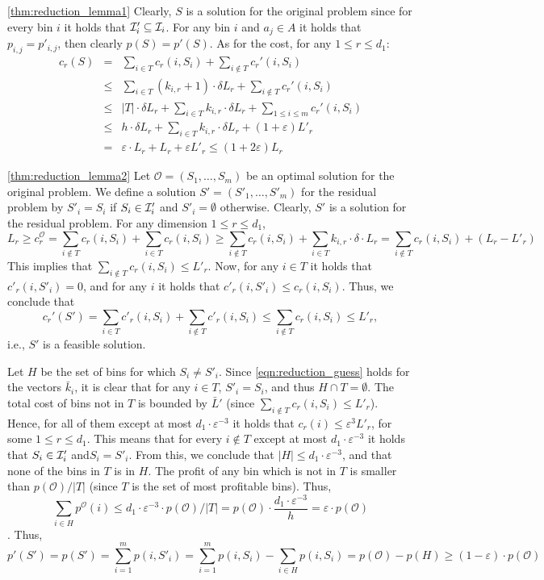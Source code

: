 \documentclass[11pt]{article}
\newcommand{\eps}{\varepsilon}
\newcommand{\bk}{\bar{k}}
\newcommand{\bS}{S}
\newcommand{\cI}{{\cal I}}
\newcommand{\bL}{\bar{L}}
\newcommand{\mO}{\mathcal{O}}
\newcommand{\abs}[1]{ \left| #1 \right |}
\newenvironment{dl_proof}[1]{\noindent{\bf Proof of Lemma #1:}}{
 \hspace*{\fill} $\Box$ \vskip \belowdisplayskip}
\begin{document}
{\begin{dl_proof}{\ref{thm:reduction_lemma1}}
Clearly, $\bS$ is a solution for the original problem since for every bin $i$ it holds that $\cI'_i \subseteq \cI_i$.
For any bin $i$ and $a_j\in A$ it holds that $p_{i,j}=p'_{i,j}$, then clearly $p(\bS)=p'(\bS)$.
As for the cost, for any $1\leq r \leq d_1$:
\begin{eqnarray*}
c_r(\bS) &=& \sum_{i\in T} c_r(i,S_i) + \sum_{i\notin T} c_r'(i,S_i) \\
&\leq& \sum_{i \in T} (k_{i,r}+1)\cdot \delta L_r +\sum_{i\notin T} c_r'(i,S_i) \\
&\leq& \abs{T} \cdot \delta  L_r + \sum_{i \in T} k_{i,r}\cdot \delta  L_r
               +\sum_{1\leq i\leq m} c_r'(i,S_i) \\
&\leq& h \cdot \delta   L_r + \sum_{i \in T} k_{i,r}\cdot \delta  L_r
               +(1+\eps) L'_r \\
&=& \eps \cdot L_r + L_r + \eps L'_r  \leq (1+2\eps) L_r
\end{eqnarray*}
\end{dl_proof}

\begin{dl_proof}{\ref{thm:reduction_lemma2}}
Let $\mO=(S_1,\ldots,S_m)$ be an optimal solution for the original problem. We define a
solution $\bS'=(S'_1,\ldots,S'_m)$ for the residual problem by $S'_i=S_i$ if  $S_i \in \cI'_i$ and
$S'_i=\emptyset$ otherwise. Clearly, $\bS'$ is a solution for the residual problem.
For any dimension $1\leq r \leq d_1$,
$$ L_r \geq c_r^{\mO} = \sum_{i \notin T} c_r(i,S_i)  + \sum_{i \in T} c_r(i,S_i) \geq
\sum_{i \notin T} c_r(i,S_i)  + \sum_{i \in T} k_{i,r} \cdot \delta \cdot L_r = \sum_{i \notin T} c_r(i,S_i) + (L_r-L'_r)$$
This implies that $\sum_{i \notin T} c_r(i,S_i) \leq L'_r$.  Now, for any $i\in T$ it holds that $c'_r(i,S'_i) = 0$, and
for any $i$ it holds that $c'_r(i,S'_i) \leq c_r(i,S_i)$. Thus, we conclude that
$$ c_r'(\bS') = \sum_{i\in T} c'_r(i,S_i) + \sum_{i \notin T} c'_r(i,S_i) \leq  \sum_{i \notin T} c_r(i,S_i) \leq L'_r,$$
i.e., $\bS'$ is a feasible solution.

Let $H$ be the set of bins for which $S_i \neq S'_i$.
Since  \eqref{eqn:reduction_guess} holds for the vectors $\bk_i$,
it is clear that for any $i\in T$, $S'_i = S_i$, and thus $H \cap T =\emptyset$.
The total cost of bins not in $T$ is bounded by $\bL'$ (since $\sum_{i \notin T} c_r(i,S_i) \leq L'_r$).
Hence, for all of them except at most $d_1 \cdot \eps^{-3} $ it holds that $c_r(i) \leq \eps^3 L'_r$,
for some $1 \leq r \leq d_1$.
This means that for every $i\notin T$ except at most $d_1 \cdot \eps^{-3} $
 it holds that $S_i \in \cI'_i$ and$S_i = S'_i$.
From this, we conclude that $\abs{H} \leq d_1 \cdot \eps^{-3}$, and that none of the bins in $T$ is
in $H$. The profit of any bin which is not in $T$ is smaller
than $p(\mO)/ \abs{T}$ (since $T$ is the set of most profitable bins).
Thus,
$$\sum_{i\in H} p^\mO(i) \leq d_1 \cdot \eps^{-3}\cdot  p(\mO)/ \abs{T} =
  p(\mO) \cdot \frac{d_1 \cdot \eps^{-3}} {h} =\eps \cdot p(\mO)$$.
Thus,
$$p'(\bS')=p(\bS')= \sum_{i=1}^{m} p(i,S'_i) = \sum_{i=1}^{m} p(i,S_i) - \sum_{i\in H} p(i,S_i)
= p(\mO) - p(H) \geq (1-\eps)\cdot p(\mO)$$
\end{dl_proof}

}
\end{document}
